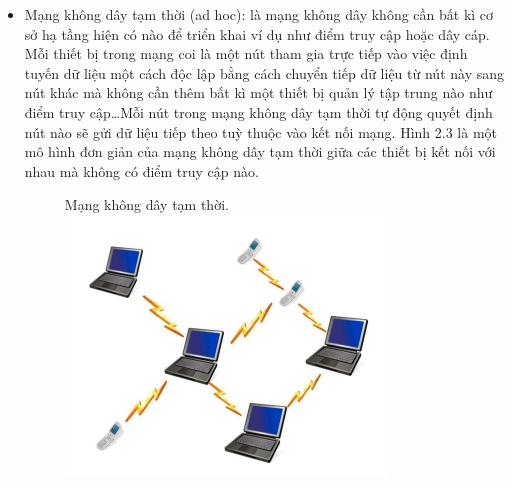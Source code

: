 \documentclass{uetgraduation}
\begin{document}
\begin{itemize}
    Mạng cảm biến không dây có một số ứng dụng sau:
    \begin{itemize}
        \item Sử dụng trong lĩnh vực an ninh như giám sát ở các khu vực nhạy cảm để phát hiện các mối đe doạ như tấn công sinh học hoặc hoá học\dots
        \item Giám sát môi trường: WSN hỗ trợ thu thập thông tin ở những khu vực khó thiết lập cơ sở hạ tầng để giám sát môi trường cũng như môi trường sống.
        \item Trong y học: sử dụng để giúp các bác sĩ theo dõi sức khoẻ của bệnh nhân.
        \item Theo dõi đối tượng: WSN có thể dùng để theo dõi các đối tượng chuyển động nếu sử dụng cảm biến phù hợp.
        \item Hỗ trợ người khuyết tật: Người khuyết tật có thể độc lập hơn và cải thiện khả năng hoạt động với việc sử dụng WSN, WSN cho phép tự chăm sóc hiệu
        quả hơn và nâng cao chất lượng cuộc sống.
    \end{itemize}

    \item Mạng không dây tạm thời (ad hoc): là mạng không dây không cần bất kì cơ sở hạ tầng hiện có nào để triển khai ví dụ như điểm truy cập hoặc dây cáp.
    Mỗi thiết bị trong mạng coi là một nút tham gia trực tiếp vào việc định tuyến dữ liệu một cách độc lập bằng cách chuyển tiếp dữ liệu từ nút này sang nút khác
    mà không cần thêm bất kì một thiết bị quản lý tập trung nào như điểm truy cập\dots Mỗi nút trong mạng không dây tạm thời tự động quyết định nút nào sẽ gửi dữ
    liệu tiếp theo tuỳ thuộc vào kết nối mạng. Hình 2.3 là một mô hình đơn giản của mạng không dây tạm thời giữa các thiết bị kết nối với nhau mà không có điểm
    truy cập nào.
    \begin{figure}{Mạng không dây tạm thời.}
        \centering
        \includegraphics[scale=0.6]{ad_hoc}
        \label{fig:adhoc}
    \end{figure}


\end{itemize}
\end{document}
